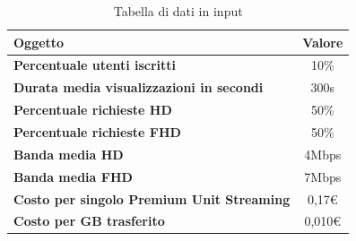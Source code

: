 \begin{table}[H]
    \label{tab:dati-input}
    \begin{tabularx}{\textwidth}{|X|c|}
        \hline
        \textbf{Oggetto} & \textbf{Valore} \\\hline
        
        \textbf{Percentuale utenti iscritti} & {10\%} \\ 
        \hline
        \textbf{Durata media visualizzazioni in secondi} & {300s} \\ 
        \hline
        \textbf{Percentuale richieste HD} & {50\%}\\
        \hline
        \textbf{Percentuale richieste FHD} & {50\%}\\  
        \hline
        \textbf{Banda media HD} & {4Mbps}\\  
        \hline
        \textbf{Banda media FHD} & {7Mbps}\\  
        \hline
        \textbf{Costo per singolo Premium Unit Streaming} & {0,17€}\\  
        \hline
        \textbf{Costo per GB trasferito} & {0,010€}\\  
        \hline
    \end{tabularx}
    \caption{Tabella di dati in input}

\end{table}

\pagebreak
